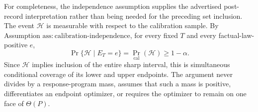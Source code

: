 For completeness, the independence assumption supplies the advertised post-record interpretation rather than being needed for the preceding set inclusion.  The event \(\mathcal H\) is measurable with respect to the calibration sample.  By Assumption \(\mathrm{ass:calibration\mbox{-}independence}\), for every fixed \(T\) and every factual-law-positive \(e\),
\[
 \Pr\{\mathcal H\mid E_T=e\}
 =\Pr_{\mathrm{cal}}(\mathcal H)
 \ge1-\alpha.
\]
Since \(\mathcal H\) implies inclusion of the entire sharp interval, this is simultaneous conditional coverage of its lower and upper endpoints.  The argument never divides by a response-program mass, assumes that such a mass is positive, differentiates an endpoint optimizer, or requires the optimizer to remain on one face of \(\Theta(P)\).
